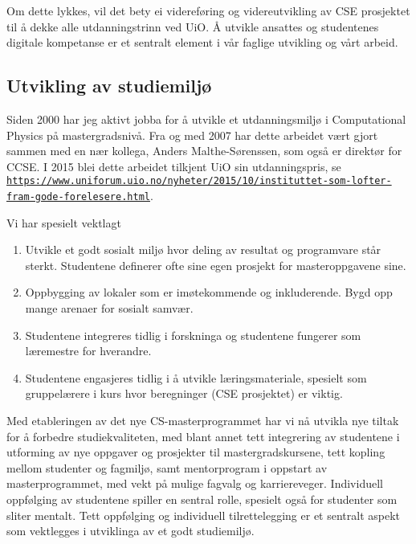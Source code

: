 \documentclass[aps,floatfix,preprint]{revtex4-1}
\begin{document}
Om dette lykkes, vil det bety ei videreføring og videreutvikling av
CSE prosjektet til å dekke alle utdanningstrinn ved UiO. Å utvikle
ansattes og studentenes digitale kompetanse er et sentralt element i
vår faglige utvikling og vårt arbeid.




\subsection*{Utvikling av studiemiljø}

Siden 2000 har jeg aktivt jobba for å utvikle et utdanningsmiljø i
Computational Physics på mastergradsnivå.  Fra og med  2007 har dette arbeidet vært
gjort sammen med en nær kollega, Anders Malthe-Sørenssen, som også er
direktør for CCSE. I 2015 blei dette arbeidet tilkjent UiO sin
utdanningspris, se
\href{{https://www.uniforum.uio.no/nyheter/2015/10/instituttet-som-lofter-fram-gode-forelesere.html}}{\nolinkurl{https://www.uniforum.uio.no/nyheter/2015/10/instituttet-som-lofter-fram-gode-forelesere.html}}.

Vi har spesielt vektlagt
\begin{enumerate}
\item Utvikle et godt sosialt miljø hvor deling av resultat og programvare  står sterkt. Studentene definerer ofte sine egen prosjekt for masteroppgavene sine.

\item Oppbygging av lokaler som er imøtekommende og inkluderende. Bygd opp mange arenaer for sosialt samvær.

\item Studentene integreres tidlig i forskninga og studentene fungerer som læremestre for hverandre.

\item Studentene engasjeres tidlig i å utvikle læringsmateriale, spesielt som gruppelærere i kurs hvor beregninger (CSE prosjektet) er viktig.
\end{enumerate}

\noindent
Med etableringen av det nye CS-masterprogrammet har vi nå utvikla nye
tiltak for å forbedre studiekvaliteten, med blant annet tett
integrering av studentene i utforming av nye oppgaver og prosjekter til
mastergradskursene, tett kopling mellom studenter og fagmiljø, samt
mentorprogram i oppstart av masterprogrammet, med vekt på mulige fagvalg og
karriereveger. Individuell oppfølging av studentene spiller en sentral
rolle, spesielt også for studenter som sliter mentalt.  Tett
oppfølging og individuell tilrettelegging er et sentralt aspekt som
vektlegges i utviklinga av et godt studiemiljø.
\end{document}
